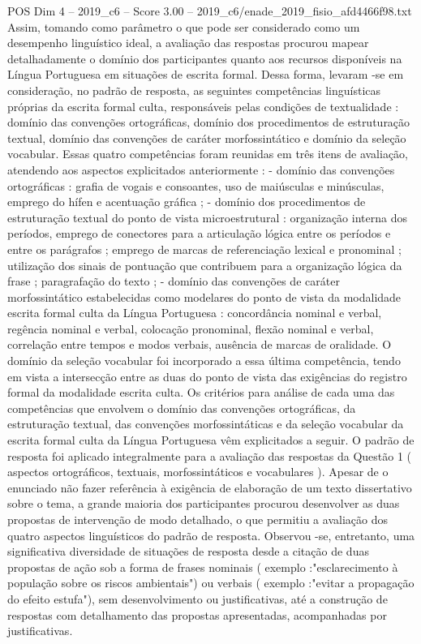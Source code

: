 \begin{textsample}{POS Dim 4 – 2019\_c6 – Score 3.00 – 2019\_c6/enade\_2019\_fisio\_afd4466f98.txt}
Assim, tomando como parâmetro o que pode ser considerado como um desempenho linguístico ideal, a avaliação das respostas procurou mapear detalhadamente o domínio dos participantes quanto aos recursos disponíveis na Língua Portuguesa em situações de escrita formal.
Dessa forma, levaram -se em consideração, no padrão de resposta, as seguintes competências linguísticas próprias da escrita formal culta, responsáveis pelas condições de textualidade : domínio das convenções ortográficas, domínio dos procedimentos de estruturação textual, domínio das convenções de caráter morfossintático e domínio da seleção vocabular.
Essas quatro competências foram reunidas em três itens de avaliação, atendendo aos aspectos explicitados anteriormente : - domínio das convenções ortográficas : grafia de vogais e consoantes, uso de maiúsculas e minúsculas, emprego do hífen e acentuação gráfica ; - domínio dos procedimentos de estruturação textual do ponto de vista microestrutural : organização interna dos períodos, emprego de conectores para a articulação lógica entre os períodos e entre os parágrafos ; emprego de marcas de referenciação lexical e pronominal ; utilização dos sinais de pontuação que contribuem para a organização lógica da frase ; paragrafação do texto ; - domínio das convenções de caráter morfossintático estabelecidas como modelares do ponto de vista da modalidade escrita formal culta da Língua Portuguesa : concordância nominal e verbal, regência nominal e verbal, colocação pronominal, flexão nominal e verbal, correlação entre tempos e modos verbais, ausência de marcas de oralidade.
O domínio da seleção vocabular foi incorporado a essa última competência, tendo em vista a intersecção entre as duas do ponto de vista das exigências do registro formal da modalidade escrita culta.
Os critérios para análise de cada uma das competências que envolvem o domínio das convenções ortográficas, da estruturação textual, das convenções morfossintáticas e da seleção vocabular da escrita formal culta da Língua Portuguesa vêm explicitados a seguir.
O padrão de resposta foi aplicado integralmente para a avaliação das respostas da Questão 1 ( aspectos ortográficos, textuais, morfossintáticos e vocabulares ).
Apesar de o enunciado não fazer referência à exigência de elaboração de um texto dissertativo sobre o tema, a grande maioria dos participantes procurou desenvolver as duas propostas de intervenção de modo detalhado, o que permitiu a avaliação dos quatro aspectos linguísticos do padrão de resposta.
Observou -se, entretanto, uma significativa diversidade de situações de resposta desde a citação de duas propostas de ação sob a forma de frases nominais ( exemplo :"esclarecimento à população sobre os riscos ambientais") ou verbais ( exemplo :"evitar a propagação do efeito estufa"), sem desenvolvimento ou justificativas, até a construção de respostas com detalhamento das propostas apresentadas, acompanhadas por justificativas.

\end{textsample}
